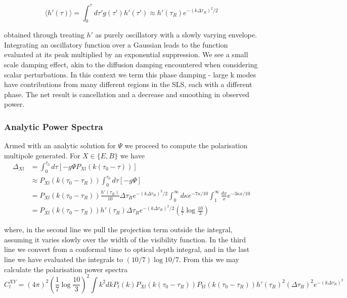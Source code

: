 \documentclass[a4paper,10pt]{article}
\begin{document}
\begin{equation}
\langle h'(\tau) \rangle = \int_0^{\tau} d\tau' g(\tau')h'(\tau') \approx h'(\tau_R)e^{-(k\Delta\tau_R)^2/2}
\end{equation}

obtained through treating $h'$ as purely oscillatory with a slowly varying envelope. Integrating an oscillatory function over a Gaussian leads to the function evaluated at its peak multiplied by an exponential suppression. We see a small scale damping effect, akin to the diffusion damping encountered when considering scalar perturbations. In this context we term this phase damping - large k modes have contributions from many different regions in the SLS, each with a different phase. The net result is cancellation and a decrease and smoothing in observed power.\\

\subsubsection{Analytic Power Spectra}

Armed with an analytic solution for $\Psi$ we proceed to compute the polarisation multipole generated. For $X\in\{E,B\}$ we have
\begin{equation}
\begin{split}
\Delta_{Xl} &= \int_0^{\tau_0} d\tau [-g\Psi P_{Xl}(k(\tau_0-\tau))]\\
&\approx P_{Xl}(k(\tau_0-\tau_R)) \int_0^{\tau_0} d\tau [-g\Psi] \\
&= P_{Xl}(k(\tau_0-\tau_R)) \frac{h'(\tau_R)}{10}\Delta\tau_Re^{-(k\Delta\tau_R)^2/2} \int_0^\infty d\kappa e^{-7\kappa/10} \int_1^\infty\frac{dx}{x}e^{-3\kappa x/10}\\
&=P_{Xl}(k(\tau_0-\tau_R)) h'(\tau_R)\Delta\tau_Re^{-(k\Delta\tau_R)^2/2} (\frac{1}{7}\log{\frac{10}{3}})
\end{split}
\end{equation}

where, in the second line we pull the projection term outside the integral, assuming it varies slowly over the width of the visibility function. In the third line we convert from a conformal time to optical depth integral, and in the last line we have evaluated the integrals to $(10/7)\log{10/7}$. From this we may calculate the polarisation power spectra
\begin{equation}
C_l^{XY} = (4\pi)^2 (\frac{1}{7}\log{\frac{10}{3}})^2 \int k^2dk P_t(k) P_{Xl}(k(\tau_0-\tau_R))P_{Yl}(k(\tau_0-\tau_R))h'(\tau_R)^2(\Delta\tau_R)^2e^{-(k\Delta\tau_R)^2}
\end{equation}
\end{document}
